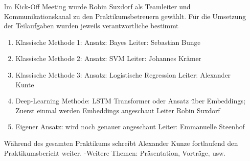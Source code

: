 Im Kick-Off Meeting wurde Robin Suxdorf als Teamleiter und Kommunikationskanal zu den Praktikumsbetreuern gewählt.  Für die Umsetzung der Teilaufgaben wurden jeweils verantwortliche bestimmt


\begin{enumerate}
    \item Klassische Methode 1: Ansatz: Bayes Leiter: Sebastian Bunge
    \item Klassische Methode 2: Ansatz: SVM Leiter: Johannes Krämer
    \item Klassische Methode 3: Ansatz: Logistische Regression Leiter: Alexander Kunte
    \item Deep-Learning Methode: LSTM Transformer oder Ansatz über Embeddings; Zuerst einmal werden Embeddings angeschaut Leiter Robin Suxdorf
    \item Eigener Ansatz: wird noch genauer angeschaut Leiter: Emmanuelle Steenhof
\end{enumerate}
Während des gesamten Praktikums schreibt Alexander Kunze fortlaufend den Praktikumsbericht weiter.
-Weitere Themen: Präsentation, Vorträge, usw. 